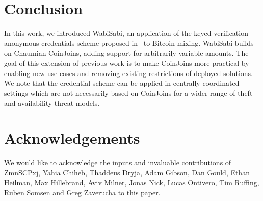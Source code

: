 \documentclass[a4paper]{article}
\begin{document}
\section{Conclusion}\label{sec:conclusion}
In this work, we introduced WabiSabi, an application of the keyed-verification anonymous credentials scheme proposed in~\cite{chase2019signal} to Bitcoin mixing. WabiSabi builds on Chaumian CoinJoins, adding support for arbitrarily variable amounts. The goal of this extension of previous work is to make CoinJoins more practical by enabling new use cases and removing existing restrictions of deployed solutions. We note that the credential scheme can be applied in centrally coordinated settings which are not necessarily based on CoinJoins for a wider range of theft and availability threat models.

\section{Acknowledgements}

We would like to acknowledge the inputs and invaluable contributions of ZmnSCPxj, Yahia Chiheb, Thaddeus Dryja, Adam Gibson, Dan Gould, Ethan Heilman, Max Hillebrand, Aviv Milner, Jonas Nick, Lucas Ontivero, Tim Ruffing, Ruben Somsen and Greg Zaverucha to this paper.

\printbibliography
\end{document}
